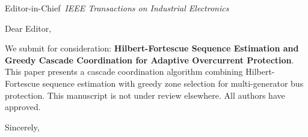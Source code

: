 \documentclass[11pt,a4paper]{letter}
\begin{document}
\begin{letter}{Editor-in-Chief\ \textit{IEEE Transactions on Industrial Electronics}}
\opening{Dear Editor,}
We submit for consideration: \textbf{Hilbert-Fortescue Sequence Estimation and Greedy Cascade Coordination for Adaptive Overcurrent Protection}.
This paper presents a cascade coordination algorithm combining Hilbert-Fortescue sequence estimation with greedy zone selection for multi-generator bus protection.
This manuscript is not under review elsewhere. All authors have approved.
\closing{Sincerely,}
\end{letter}
\end{document}
